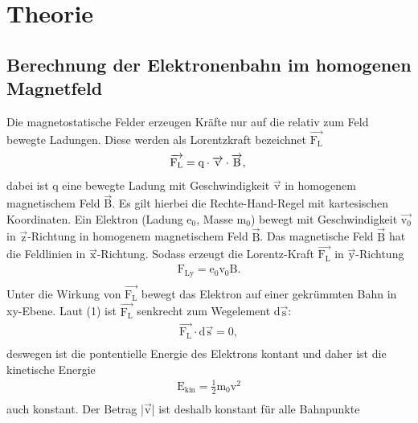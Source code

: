 \section{Theorie}
\label{sec:Theorie}
\subsection{Berechnung der Elektronenbahn im homogenen Magnetfeld}
Die magnetostatische Felder erzeugen Kräfte nur auf die relativ zum Feld bewegte Ladungen. Diese werden als Lorentzkraft bezeichnet $\overrightarrow{\text{F}_{\text{L}}}$
\begin{equation}
    \overrightarrow{\text{F}_{\text{L}}}=\text{q} \cdot \overrightarrow{\text{v}} \cdot \overrightarrow{\text{B}},\\
   \end{equation}
\noindent dabei ist q eine bewegte Ladung mit Geschwindigkeit $\overrightarrow{\text{v}}$ in homogenem magnetischem Feld $\overrightarrow{\text{B}}$.
Es gilt hierbei die Rechte-Hand-Regel mit kartesischen Koordinaten. Ein Elektron (Ladung $\text{e}_0$, Masse $\text{m}_0$) 
bewegt mit Geschwindigkeit $\overrightarrow{\text{v}_0}$ in $\overrightarrow{\text{z}}$-Richtung in homogenem magnetischem Feld $\overrightarrow{\text{B}}$.
 Das magnetische Feld $\overrightarrow{\text{B}}$ hat die Feldlinien in $\overrightarrow{\text{x}}$-Richtung. Sodass erzeugt die Lorentz-Kraft $\overrightarrow{\text{F}_{\text{L}}}$ in $\overrightarrow{\text{y}}$-Richtung
 \begin{align*}
    \text{F}_{\text{Ly}}= \text{e}_0 \text{v}_0 \text{B}.\\
 \end{align*}
 \noindent Unter die Wirkung von $\overrightarrow{\text{F}_{\text{L}}}$ bewegt das Elektron auf einer gekrümmten Bahn in xy-Ebene. 
 Laut (1) ist $\overrightarrow{\text{F}_{\text{L}}}$ senkrecht zum Wegelement d$\overrightarrow{\text{s}}$:
 \begin{align*}
    \overrightarrow{\text{F}_{\text{L}}} \cdot  \text{d}\overrightarrow{\text{s}} = 0,\\
 \end{align*}
 \noindent deswegen ist die pontentielle Energie des Elektrons kontant und daher  ist die kinetische Energie 
 \begin{align*}
    \text{E}_\text{kin} = \frac{1}{2} \text{m}_0 {\text{v}}^2\\
 \end{align*}
 \noindent auch konstant. Der Betrag |$\overrightarrow{\text{v}}$| ist deshalb konstant für alle Bahnpunkte 
